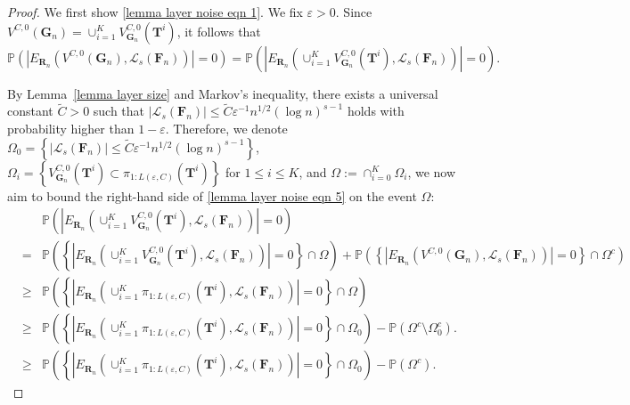 \documentclass[twoside,11pt]{article}
\theoremstyle{remark}
\begin{document}
\begin{proof}
We first show \eqref{lemma layer noise eqn 1}. We fix $\varepsilon > 0$. 
Since $V^{C,0}\left(\boldsymbol{G}_{n}\right)=\cup_{i=1}^K V^{C,0}_{\boldsymbol{G}_n}\left(\boldsymbol{T}^i\right)$, it follows that 
%
\begin{equation}
\label{lemma layer noise eqn 5}
\mathbb{P}\left(\left|E_{\boldsymbol{R}_n}\left(V^{C,0}\left(\boldsymbol{G}_n\right), \mathcal{L}_s\left(\boldsymbol{F}_n\right)\right)\right|=0\right)=\mathbb{P}\left(\left|E_{\boldsymbol{R}_n}\left(\cup_{i=1}^K V^{C,0}_{\boldsymbol{G}_n}\left(\boldsymbol{T}^i\right), \mathcal{L}_s\left(\boldsymbol{F}_n\right)\right)\right|=0\right). 
\end{equation}
%

By Lemma~\ref{lemma layer size} and Markov's inequality, there exists a universal constant $\tilde{C} > 0$ such that $\left|\mathcal{L}_s\left(\boldsymbol{F}_n\right)\right|\le \tilde{C} \varepsilon^{-1} n^{1/2}\left(\log n\right)^{s-1}$ holds with probability higher than $1-\varepsilon$.
Therefore, we denote $\Omega_0=\left\{\left|\mathcal{L}_s\left(\boldsymbol{F}_n\right)\right|\le \tilde{C} \varepsilon^{-1} n^{1/2}\left(\log n\right)^{s-1}\right\}$, $\Omega_i=\left\{ V^{C,0}_{\boldsymbol{G}_n}\left(\boldsymbol{T}^i\right)\subset\pi_{1:{L\left(\varepsilon, C\right)}}\left(\boldsymbol{T}^i\right)\right\}$ for $1\le i\le K$, and $\Omega:=\cap_{i=0}^K \Omega_i$, we now aim to bound the right-hand side of \eqref{lemma layer noise eqn 5}  on the event $\Omega$:
%
\begingroup
\begin{eqnarray}
\label{lemma layer noise eqn 6}
\nonumber
&&\mathbb{P}\left(\left|E_{\boldsymbol{R}_n}\left(\cup_{i=1}^K V^{C,0}_{\boldsymbol{G}_n}\left(\boldsymbol{T}^i\right),\mathcal{L}_s\left(\boldsymbol{F}_n\right)\right)\right|=0\right)\\
\nonumber
&=&
\mathbb{P}\left(\left\{\left|E_{\boldsymbol{R}_n}\left(\cup_{i=1}^K V^{C,0}_{\boldsymbol{G}_n}\left(\boldsymbol{T}^i\right),\mathcal{L}_s\left(\boldsymbol{F}_n\right)\right)\right|=0\right\}\cap \Omega\right)+
\mathbb{P}\left(\left\{\left|E_{\boldsymbol{R}_n}\left(V^{C,0}\left(\boldsymbol{G}_n\right),\mathcal{L}_s\left(\boldsymbol{F}_n\right)\right)\right|=0\right\}\cap \Omega^c\right)\\
\nonumber
&\geq& \mathbb{P}\left(\left\{\left|E_{\boldsymbol{R}_n}\left(\cup_{i=1}^K \pi_{1:L\left(\varepsilon,C\right)}\left(\boldsymbol{T}^i\right),\mathcal{L}_s\left(\boldsymbol{F}_n\right)\right)\right|=0\right\}\cap \Omega\right)\\
\nonumber
&\geq & \mathbb{P}\left(\left\{\left|E_{\boldsymbol{R}_n}\left(\cup_{i=1}^K \pi_{1:L\left(\varepsilon,C\right)}\left(\boldsymbol{T}^i\right),\mathcal{L}_s\left(\boldsymbol{F}_n\right)\right)\right|=0\right\}\cap \Omega_0 \right)-\mathbb{P}\left(\Omega^c\setminus\Omega_0^c\right).
\\
&\geq & \mathbb{P}\left(\left\{\left|E_{\boldsymbol{R}_n}\left(\cup_{i=1}^K \pi_{1:L\left(\varepsilon,C\right)}\left(\boldsymbol{T}^i\right),\mathcal{L}_s\left(\boldsymbol{F}_n\right)\right)\right|=0\right\}\cap \Omega_0 \right)-\mathbb{P}\left(\Omega^c\right).
\end{eqnarray}
\endgroup
%


\end{proof}
\end{document}
